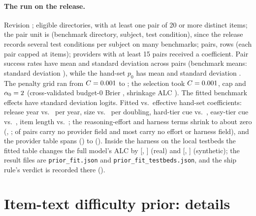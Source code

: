 \documentclass{article}
\begin{document}
\paragraph{The run on the release.} Revision \texttt{\FitRevisionShort}; \FitNEligible{} eligible directories, \FitNBench{} with at least one pair of 20 or more distinct items; the pair unit is (benchmark directory, subject, test condition), since the release records several test conditions per subject on many benchmarks; \FitNPairs{} pairs, \FitNRows{} rows (each pair capped at \FitMaxItemsPerPair{} items); \FitNProviders{} providers with at least 15 pairs received a coefficient. Pair success rates have mean \FitRateMean{} and standard deviation \FitRateSd{} across pairs (benchmark means: standard deviation \FitBenchRateSd), while the hand-set $p_0$ has mean \FitHandPMean{} and standard deviation \FitHandPSd. The penalty grid ran from $C=0.001$ to \FitCMax; the selection took $C=0.001$, cap \FitSelCap{} and $\alpha_0=2$ (cross-validated budget-0 Brier \FitSelBZero, shrinkage ALC \FitSelAlc). The fitted benchmark effects have standard deviation \FitBenchEffectSd{} logits. Fitted vs.\ effective hand-set coefficients: release year \FitCoefYear{} vs.\ \HandEffCoefYear{} per year, size \FitCoefSize{} vs.\ \HandEffCoefSize{} per doubling, hard-tier cue \FitCoefTierHard{} vs.\ \HandEffCoefTierHard, easy-tier cue \FitCoefTierEasy{} vs.\ \HandEffCoefTierEasy, item length \FitCoefLength{} vs.\ \HandEffCoefLength; the reasoning-effort and harness terms shrink to about zero (\FitCoefEffortHigh, \FitCoefHarness; \FitFracPairsNoProvider{} of pairs carry no provider field and most carry no effort or harness field), and the provider table spans \FitProvMin{} (\texttt{\FitProvMinName}) to \FitProvMax{} (\texttt{\FitProvMaxName}). Inside the harness on the local testbeds the fitted table changes the full model's ALC by \FitRealPairFullMean{} [\FitRealPairFullLo, \FitRealPairFullHi] (real) and \FitSynPairFullMean{} [\FitSynPairFullLo, \FitSynPairFullHi] (synthetic); the result files are \texttt{prior\_fit.json} and \texttt{prior\_fit\_testbeds.json}, and the ship rule's verdict is recorded there (\FitShip).

\section{Item-text difficulty prior: details}
\label{app:textprior}
\end{document}
